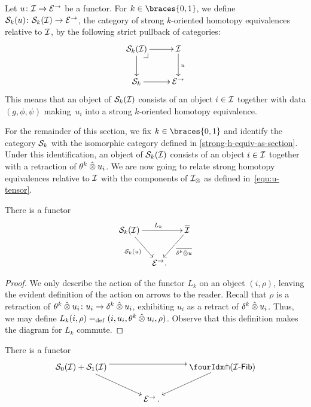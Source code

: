 \documentclass[reqno,10pt,a4paper,oneside,draft]{amsart}
\begin{document}
Let $u \co \cal{I} \to \catE^\to$ be a functor.
For $k \in \braces{0, 1}$, we define $\cal{S}_k(u) \co \cal{S}_k(\cal{I}) \to \catE^\to$, the category of strong $k$-oriented homotopy equivalences relative to $\cal{I}$, by the following strict pullback of categories:
\begin{equation} \label{rel-strong-h-equiv-def}
\begin{gathered}
\xymatrix{
  \cal{S}_k(\cal{I})
  \ar[r]
  \ar[d]
  \pullback{dr}
&
  \cal{I}
  \ar[d]^{u}
\\
  \cal{S}_k
  \ar[r]
&
  \catE^\to
}
\end{gathered}
\end{equation}
This means that an object of $\cal{S}_k(\cal{I})$ consists of an object $i \in \cal{I}$ together with data $(g, \phi, \psi)$ making~$u_i$ into a strong $k$-oriented homotopy equivalence.

For the remainder of this section, we fix $k \in \braces{0, 1}$ and identify the category $\cal{S}_k$ with the isomorphic category defined in \cref{strong-h-equiv-as-section}.
Under this identification, an object of $\cal{S}_k(\cal{I})$ consists of an object $i \in \cal{I}$ together with a retraction of $\thetak \hatotimes u_i$.
We are now going to relate strong homotopy equivalences relative to $\cal{I}$ with the components of $\cal{I}_\otimes$ as defined in~\eqref{equ:u-tensor}.

\begin{lemma} \label{lem:from-strong-hequiv}
There is a functor
\[
\xymatrix@!C@C-2em{
  \cal{S}_k(\cal{I})
  \ar[dr]_{\cal{S}_k(u)}
  \ar[rr]^{L_k}
&&
  \overline{\cal{I}}
  \ar[dl]^-{\overline{\kcyl \hatotimes u}}
\\&
  \catE^\to
\rlap{.}}
\]
\end{lemma}

\begin{proof}
We only describe the action of the functor $L_k$ on an object $(i, \rho)$, leaving the evident definition of the action on arrows to the reader.
Recall that $\rho$ is a retraction of $\thetak \hatotimes u_i \co u_i \to \kcyl \hatotimes u_i$, exhibiting $u_i$ as a retract of $\kcyl \hatotimes u_i$.
Thus, we may define $L_k(i, \rho) \defeq (i, u_i, \thetak \hatotimes u_i, \rho)$.
Observe that this definition makes the diagram for $L_k$ commute.
\end{proof}

\begin{proposition} \label{thm:onedir} There is a functor
\[
\xymatrix@!C@C-2.5em{
\cal{S}_0(\cal{I}) + \cal{S}_1(\cal{I})
  \ar[dr]
  \ar@<4pt>[rr]
&&
  \liftl{(\Fib{\cal{I}})}
  \ar[dl]
\\&
  \catE^\to \, .
}
\]
\end{proposition}
\end{document}
